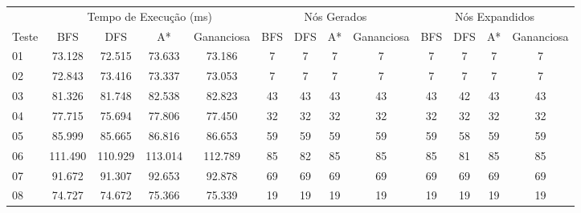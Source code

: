 \documentclass[12pt,a4paper]{article}
\begin{document}
\begin{adjustbox}{width={\textwidth}, totalheight={\textheight}, keepaspectratio}
      \begin{tabular}{l cccc cccc cccc}
            \toprule
                  & \multicolumn{4}{c}{Tempo de Execução (ms)} & \multicolumn{4}{c}{Nós Gerados} & \multicolumn{4}{c}{Nós Expandidos}                                                                            \\
            \cmidrule(lr){2-5} \cmidrule(lr){6-9} \cmidrule(lr){10-13}
            Teste & BFS                                        & DFS                             & A*                                 & Gananciosa & BFS & DFS & A*  & Gananciosa & BFS & DFS & A*  & Gananciosa \\
            \midrule
            01    & 73.128                                     & 72.515                          & 73.633                             & 73.186     & 7   & 7   & 7   & 7          & 7   & 7   & 7   & 7          \\
            02    & 72.843                                     & 73.416                          & 73.337                             & 73.053     & 7   & 7   & 7   & 7          & 7   & 7   & 7   & 7          \\
            03    & 81.326                                     & 81.748                          & 82.538                             & 82.823     & 43  & 43  & 43  & 43         & 43  & 42  & 43  & 43         \\
            04    & 77.715                                     & 75.694                          & 77.806                             & 77.450     & 32  & 32  & 32  & 32         & 32  & 32  & 32  & 32         \\
            05    & 85.999                                     & 85.665                          & 86.816                             & 86.653     & 59  & 59  & 59  & 59         & 59  & 58  & 59  & 59         \\
            06    & 111.490                                    & 110.929                         & 113.014                            & 112.789    & 85  & 82  & 85  & 85         & 85  & 81  & 85  & 85         \\
            07    & 91.672                                     & 91.307                          & 92.653                             & 92.878     & 69  & 69  & 69  & 69         & 69  & 69  & 69  & 69         \\
            08    & 74.727                                     & 74.672                          & 75.366                             & 75.339     & 19  & 19  & 19  & 19         & 19  & 19  & 19  & 19         \\

\end{tabular}
\end{adjustbox}
\end{document}
